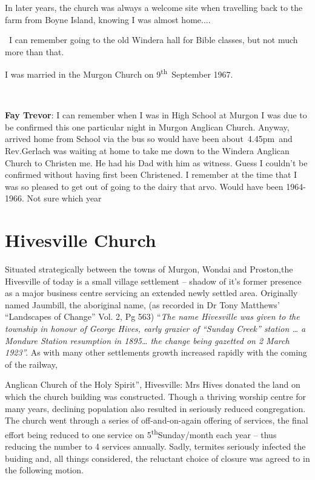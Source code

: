 In later years, the church was always a welcome site when travelling back to the farm from Boyne Island, knowing I was almost home....

~I can remember going to the old Windera hall for Bible classes, but not much more than that.

I was married in the Murgon Church on 9\textsuperscript{th}~September 1967.

~

\textbf{Fay Trevor}: I can remember when I was in High School at Murgon I was due to be confirmed this one particular night in Murgon Anglican Church. Anyway, arrived home from School via the bus so would have been about~4.45pm~and Rev.Gerlach was waiting at home to take me down to the Windera Anglican Church to Christen me. He had his Dad with him as witness. Guess I couldn't be confirmed without having first been Christened. I remember at the time that I was so pleased to get out of going to the dairy that arvo. Would have been 1964-1966. Not sure which year

\hypertarget{hivesville-church}{%
\section{Hivesville Church}\label{hivesville-church}}

Situated strategically between the towns of Murgon, Wondai and Proston,the Hivesville of today is a small village settlement -- shadow of it's former presence as a major business centre servicing an extended newly settled area. Originally named Jaumbill, the aboriginal name, (as recorded in Dr Tony Matthews' ``Landscapes of Change'' Vol. 2, Pg 563) ``\emph{The name Hivesville was given to the township in honour of George Hives, early grazier of ``Sunday Creek'' station \ldots{} a Mondure Station resumption in 1895\ldots{} the change being gazetted on 2 March 1923''.} As with many other settlements growth increased rapidly with the coming of the railway,

Anglican Church of the Holy Spirit'', Hivesville: Mrs Hives donated the land on which the church building was constructed. Though a thriving worship centre for many years, declining population also resulted in seriously reduced congregation. The church went through a series of off-and-on-again offering of services, the final effort being reduced to one service on 5\textsuperscript{th}Sunday/month each year -- thus reducing the number to 4 services annually. Sadly, termites seriously infected the buiding and, all things considered, the reluctant choice of closure was agreed to in the following motion.


